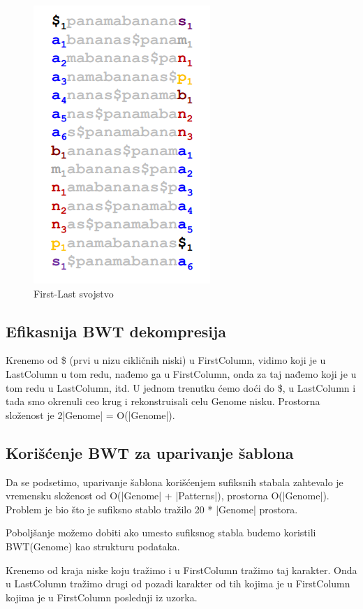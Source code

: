 \begin{figure}[h!]
\centering
\includegraphics[scale=0.6]{poglavlja/9/slike/firstLast.png}
\caption{First-Last svojstvo}
\label{slika:X}
\end{figure}

\subsection{Efikasnija BWT dekompresija}

Krenemo od \$ (prvi u nizu cikličnih niski) u FirstColumn, vidimo koji je u LastColumn u tom redu, nađemo ga u FirstColumn, onda za taj nađemo koji je u tom redu u LastColumn, itd. U jednom trenutku ćemo doći do \$, u LastColumn i tada smo okrenuli ceo krug i rekonstruisali celu Genome nisku.
Prostorna složenost je 2|Genome| = O(|Genome|).


\subsection{Korišćenje BWT za uparivanje šablona}

Da se podsetimo, uparivanje šablona korišćenjem sufiksnih stabala zahtevalo je vremensku složenost od O(|Genome| + |Patterns|), prostorna O(|Genome|). Problem je bio što je sufiksno stablo tražilo 20 * |Genome| prostora.

Poboljšanje možemo dobiti ako umesto sufiksnog stabla budemo koristili BWT(Genome) kao strukturu podataka.

Krenemo od kraja niske koju tražimo i u FirstColumn tražimo taj karakter. Onda u LastColumn tražimo drugi od pozadi karakter od tih kojima je u FirstColumn kojima je u FirstColumn poslednji iz uzorka.

